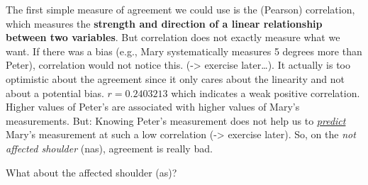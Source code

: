\documentclass[
]{book}
\begin{document}
The first simple measure of agreement we could use is the (Pearson) correlation, which
measures the \textbf{strength and direction of a linear relationship between two variables}.
But correlation does not exactly measure what we want. If there was a bias
(e.g., Mary systematically measures 5 degrees more than Peter), correlation would not
notice this. (-\textgreater{} exercise later\ldots). It actually is too optimistic about
the agreement since it only cares about the linearity and not about a potential bias.
\(r=0.2403213\) which indicates a weak positive correlation. Higher values of Peter's
are associated with higher values of Mary's measurements.
But: Knowing Peter's measurement does not help us to \href{https://en.wikipedia.org/wiki/Pearson_correlation_coefficient\#Interpretation_of_the_size_of_a_correlation}{\emph{predict}}
Mary's measurement at such a low correlation (-\textgreater{} exercise later).
So, on the \emph{not affected shoulder} (nas), agreement is really bad.

What about the affected shoulder (as)?
\end{document}
